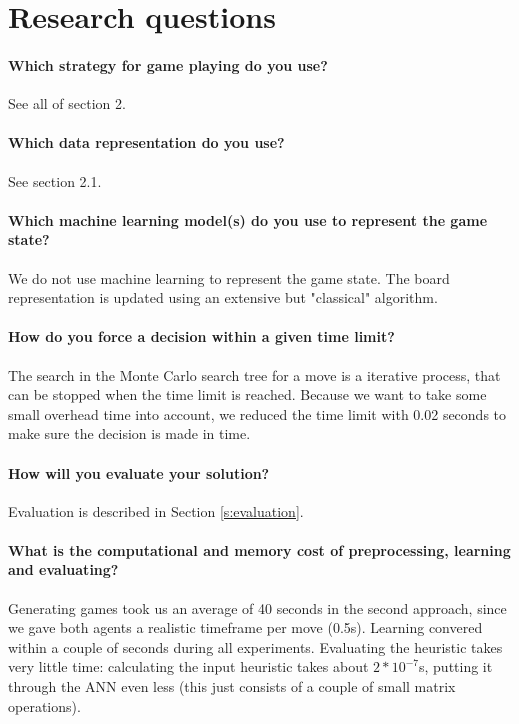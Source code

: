 \section{Research questions}
\paragraph{Which strategy for game playing do you use?} See all of section 2.
	
\paragraph{Which data representation do you use?} See section 2.1.

\paragraph{Which machine learning model(s) do you use to represent the game state?} We do not use machine learning to represent the game state. The board representation is updated using an extensive but "classical" algorithm.
	
\paragraph{How do you force a decision within a given time limit?} The search in the Monte Carlo search tree for a move is a iterative process, that can be stopped when the time limit is reached. Because we want to take some small overhead time into account, we reduced the time limit with 0.02 seconds to make sure the decision is made in time.
	
\paragraph{How will you evaluate your solution?} Evaluation is described in Section \ref{s:evaluation}.
	
\paragraph{What is the computational and memory cost of preprocessing, learning and evaluating?} Generating games took us an average of 40 seconds in the second approach, since we gave both agents a realistic timeframe per move (0.5s). Learning convered within a couple of seconds during all experiments. Evaluating the heuristic takes very little time: calculating the input heuristic takes about $2*10^{-7}$s, putting it through the ANN even less (this just consists of a couple of small matrix operations).
	
